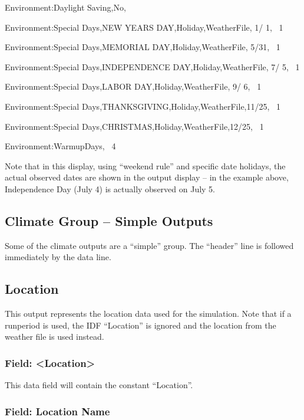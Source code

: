 Environment:Daylight Saving,No,

Environment:Special Days,NEW YEARS DAY,Holiday,WeatherFile, 1/ 1,~ 1

Environment:Special Days,MEMORIAL DAY,Holiday,WeatherFile, 5/31,~ 1

Environment:Special Days,INDEPENDENCE DAY,Holiday,WeatherFile, 7/ 5,~ 1

Environment:Special Days,LABOR DAY,Holiday,WeatherFile, 9/ 6,~ 1

Environment:Special Days,THANKSGIVING,Holiday,WeatherFile,11/25,~ 1

Environment:Special Days,CHRISTMAS,Holiday,WeatherFile,12/25,~ 1

Environment:WarmupDays,~ 4

Note that in this display, using ``weekend rule'' and specific date holidays, the actual observed dates are shown in the output display -- in the example above, Independence Day (July 4) is actually observed on July 5.

\subsection{Climate Group -- Simple Outputs}\label{climate-group-simple-outputs}

Some of the climate outputs are a ``simple'' group. The ``header'' line is followed immediately by the data line.

\subsection{Location}\label{location}

This output represents the location data used for the simulation. Note that if a runperiod is used, the IDF ``Location'' is ignored and the location from the weather file is used instead.

\subsubsection{Field: \textless{}Location\textgreater{}}\label{field-location}

This data field will contain the constant ``Location''.

\subsubsection{Field: Location Name}\label{field-location-name}

